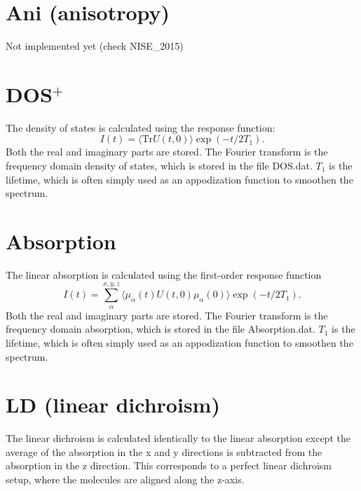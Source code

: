 \section{Ani (anisotropy)}
Not implemented yet (check NISE\_2015)

\section{DOS$^{+}$}
The density of states is calculated using the response function:
\begin{equation}
	I(t)=\langle\textrm{Tr}U(t,0)\rangle\exp(-t/2T_1).
\end{equation}
Both the real and imaginary parts are stored. The Fourier transform is the frequency domain density of states, which is stored in the file DOS.dat. $T_1$ is the lifetime, which is often simply used as an appodization function to smoothen the spectrum.

\section{Absorption}
The linear absorption is calculated using the first-order response function \cite{Duan_2015}
\begin{equation}
	I(t)=\sum_{\alpha}^{x,y,z}\langle\mu_{\alpha}(t)U(t,0)\mu_{\alpha}(0)\rangle\exp(-t/2T_1).
\end{equation}
Both the real and imaginary parts are stored. The Fourier transform is the frequency domain absorption, which is stored in the file Absorption.dat. $T_1$ is the lifetime, which is often simply used as an appodization function to smoothen the spectrum. 

\section{LD (linear dichroism)}
The linear dichroism is calculated identically to the linear absorption except the average of
the absorption in the x and y directions is subtracted from the absorption in the z direction.
This corresponds to a perfect linear dichroism setup, where the molecules are aligned along the z-axis.

